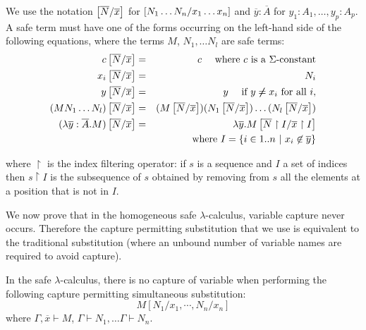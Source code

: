 \begin{dfn}
\label{dnf:safe_simsubst}
 We use the notation $\left[ \overline{N}/\overline{x} \right]$ for $\left[ N_1 \ldots N_n/x_1 \ldots x_n \right]$ and
$\overline{y}:\overline{A}$ for $y_1:A_1, \ldots, y_p:A_p$.
A safe term must have one of the forms occurring on the left-hand side of the following equations, where
the terms $M$, $N_1, \ldots N_l$ are safe terms:
\begin{eqnarray*}
c \left[ \overline{N}/\overline{x} \right] &=& c \quad \mbox{ where $c$ is a $\Sigma$-constant}\\
x_i \left[ \overline{N}/\overline{x} \right] &=& N_i\\
 y \left[ \overline{N}/\overline{x} \right] &=& y \quad \mbox{ if } y \not \neq x_i \mbox{ for all } i,\\
(M N_1 \ldots N_l) \left[ \overline{N}/\overline{x} \right] &=& (M \left[ \overline{N}/\overline{x} \right]) (N_1 \left[ \overline{N}/\overline{x} \right]) \ldots  (N_l \left[ \overline{N}/\overline{x} \right])\\
(\lambda \overline{y} : \overline{A}. M)
\left[ \overline{N}/\overline{x} \right] &=& \lambda \overline{y} . M
\left[ \overline{N} \upharpoonright I/\overline{x} \upharpoonright I \right] \\
&& \mbox{where } I  = \{ i \in 1..n \ | \ x_i \not \in \overline{y} \}
\end{eqnarray*}

where $ \upharpoonright$ is the index filtering operator: if $s$ is a sequence and $I$ a set of indices then
$s \upharpoonright I$ is the subsequence of $s$ obtained by removing from $s$ all the elements
at a position that is not in $I$.
\end{dfn}

We now prove that in the homogeneous safe $\lambda$-calculus, variable capture never occurs. Therefore
the capture permitting substitution that we use is equivalent to the traditional substitution (where an unbound number of
variable names are required to avoid capture).

\begin{lem}
In the safe $\lambda$-calculus, there is no capture of variable
when performing the following capture permitting simultaneous substitution:
$$ M[N_1 / x_1 , \cdots, N_n / x_n] $$
where $\Gamma,\overline{x} \vdash M$, $\Gamma \vdash  N_1, \ldots \Gamma \vdash  N_n$.

\end{lem}

